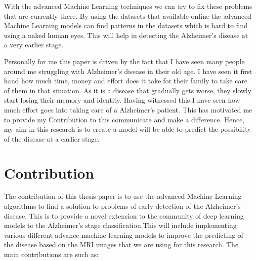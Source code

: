 \documentclass[12pt,twocolumn]{report}
\begin{document}
With the advanced Machine Learning techniques we can try to fix these problems that are currently there. By using the datasets that available online the advanced Machine Learning models can find patterns in the datasets which is hard to find using a naked human eyes. This will help in detecting the  Alzheimer's disease at a very earlier stage. 

Personally for me this paper is driven by the fact that I have seen many people around me struggling with Alzheimer's disease in their old age. I have seen it first hand how much time, money and effort does it take for their family to take care of them in that situation. As it is a disease that gradually gets worse, they slowly start losing their memory and identity. Having witnessed this I have seen how much effort goes into taking care of a Alzheimer's patient. This has motivated me to provide my Contribution to this communicate and make a difference. Hence, my aim in this research is to create a model will be able to predict the possibility of the disease at a earlier stage. 


\chapter{Contribution}

The contribution of this thesis paper is to use the advanced Machine Learning algorithms to find a solution to problems of early detection of the Alzheimer's disease. This is to provide a novel extension to the community of deep learning models to the Alzheimer’s stage classification.This will include implementing various different advance machine learning models to improve the predicting of the disease based on the MRI images that we are using for this research. The main contributions are such as:
\end{document}
